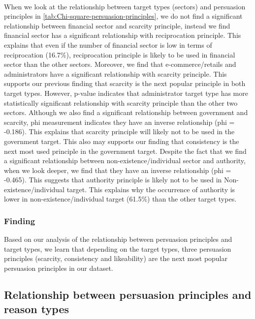 \ \\
When we look at the relationship between target types (sectors) and
persuasion principles in \autoref{tab:Chi-square-persuasion-principles},
we do not find a significant relationship between financial sector
and scarcity principle, instead we find financial sector has a significant
relationship with reciprocation principle. This explains that even
if the number of financial sector is low in terms of reciprocation
(16.7\%), reciprocation principle is likely to be used in financial
sector than the other sectors. Moreover, we find that e-commerce/retails
and administrators have a significant relationship with scarcity principle.
This supports our previous finding that scarcity is the next popular
principle in both target types. However, p-value indicates that administrator
target type has more statistically significant relationship with scarcity
principle than the other two sectors. Although we also find a significant
relationship between government and scarcity, phi measurement indicates
they have an inverse relationship (phi = -0.186). This explains that
scarcity principle will likely not to be used in the government target.
This also may supports our finding that consistency is the next most
used principle in the government target. Despite the fact that we
find a significant relationship between non-existence/individual sector
and authority, when we look deeper, we find that they have an inverse
relationship (phi = -0.465). This suggests that authority principle
is likely not to be used in Non-existence/individual target. This
explains why the occurrence of authority is lower in non-existence/individual
target (61.5\%) than the other target types.


\subsubsection{\label{sub:Finding}Finding}

Based on our analysis of the relationship between persuasion principles
and target types, we learn that depending on the target types, three
persuasion principles (scarcity, consistency and likeability) are
the next most popular persuasion principles in our dataset.


\subsection{\label{sub:Relationship-between-persuasion-1}Relationship between
persuasion principles and reason types}

